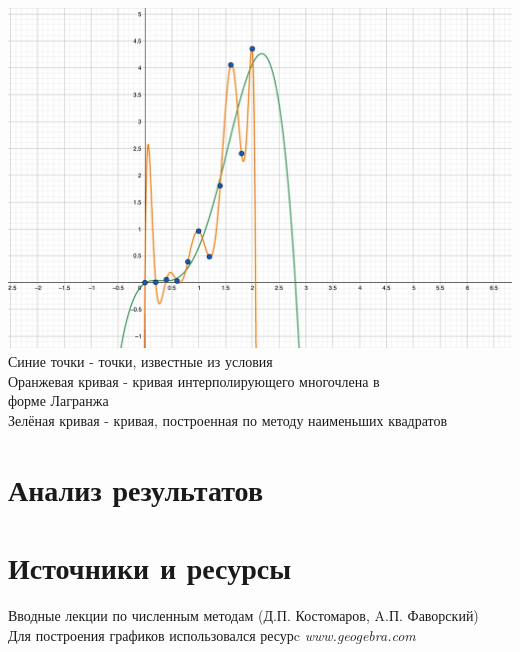 \documentclass[a4paper, 14pt]{extreport}
\begin{document}
\includegraphics[width =\textwidth]{graphic}
Синие точки - точки, известные из условия \\
Оранжевая кривая - кривая интерполирующего многочлена в \\ форме Лагранжа \\
Зелёная кривая - кривая, построенная по методу наименьших квадратов

\section*{Анализ результатов}

\section*{Источники и ресурсы}
Вводные лекции по численным методам (Д.П. Костомаров, A.П. Фаворский) \\
Для построения графиков использовался ресурc \textit{www.geogebra.com}
\end{document}
